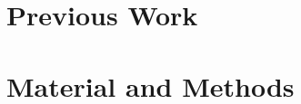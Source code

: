 \documentclass[10pt,a4paper]{article}
\theoremstyle{definition}
\theoremstyle{remark}
\begin{document}
%
%
%
%
%
%
%

\section{Previous Work}

\section{Material and Methods}
\end{document}
